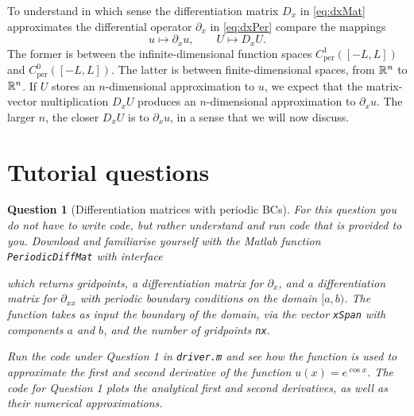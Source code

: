 \documentclass[a4paper]{siamart220329}
\theoremstyle{plain}
\newtheorem{question}{Question}
\begin{document}
To understand in which sense the differentiation matrix $D_x$ in \cref{eq:dxMat} approximates the
differential operator $\partial_x$ in \cref{eq:dxPer} compare the mappings
\[
  u \mapsto \partial_{x} u,  \qquad U \mapsto D_{x} U.
\]
The former is between the infinite-dimensional function spaces $C^1_\textrm{per}([-L,L])$
and $C^0_\textrm{per}([-L,L])$. The latter is between finite-dimensional spaces, from $\mathbb{R}^n$
to $\mathbb{R}^n$. If $U$ stores an $n$-dimensional approximation to $u$, we expect that
the matrix-vector multiplication $D_x U$ produces an $n$-dimensional approximation to
$\partial_x u$. The larger $n$, the closer $D_x U$ is to
$\partial_x u$, in a sense that we will now discuss.

\section{Tutorial questions}
\begin{question}[Differentiation matrices with periodic BCs]
For this question you do not have to write code, but rather understand and run
code that is provided to you. Download and familiarise yourself with the 
Matlab function \lstinline|PeriodicDiffMat| with interface

which returns gridpoints, a differentiation matrix for $\partial_x$, and a
differentiation matrix for $\partial_{x x}$ with periodic boundary conditions on the
domain $[a,b)$. The
function takes as input the boundary of the domain, via the vector
\lstinline|xSpan| with components $a$ and $b$, and the number of gridpoints
\lstinline|nx|.

Run the code under Question 1 in \lstinline|driver.m| and see how the function is
used to approximate the first
and second derivative of the function $u(x) = e^{\cos x}$. The code for Question 1
plots the analytical first and second derivatives, as well as their numerical
approximations. 
\end{question}
\end{document}
